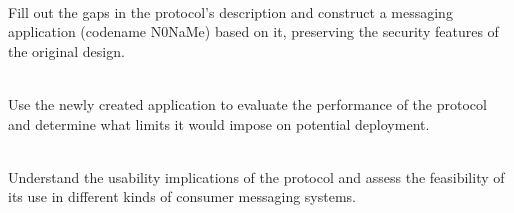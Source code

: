 \documentclass[a4paper, twoside, 12pt]{report}
\newcommand{\funkytt}{\fontfamily{AnonymousPro}\selectfont}
\begin{document}
\begin{description}[labelindent=0.5cm, leftmargin=1.3cm, rightmargin=0.5cm]
    \item[Implementation] \hfill \\
        Fill out the gaps in the protocol's description and construct a messaging application (codename {\funkytt N0NaMe}) based on it, preserving the security features of the original design.
        
    \item[Evaluation of Performance] \hfill \\
        Use the newly created application to evaluate the performance of the protocol and determine what limits it would impose on potential deployment.
        
    \item[Evaluation of Usability] \hfill \\
        Understand the usability implications of the protocol and assess the feasibility of its use in different kinds of consumer messaging systems.

\end{description}
\end{document}
